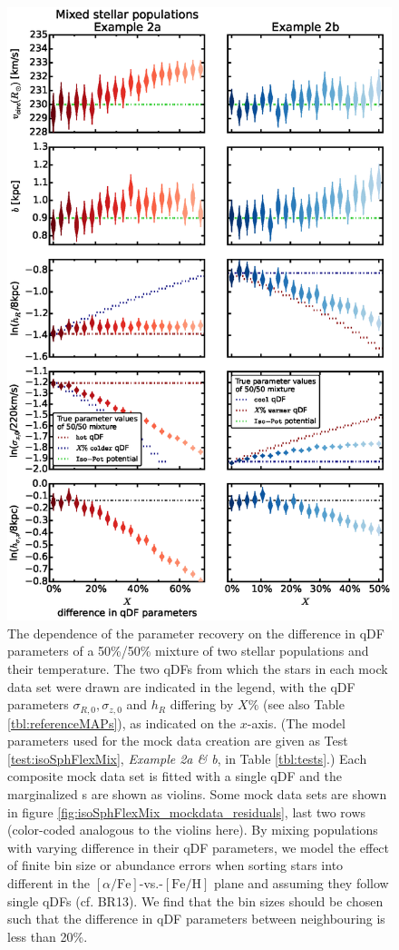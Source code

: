 \begin{figure}[!htbp]
\centering
\includegraphics[scale=0.45]{figs/isoSphFlexMixDiff_violins_2.eps}
\caption{The dependence of the parameter recovery on the difference in qDF parameters of a 50\%/50\% mixture of two stellar populations and their temperature. The two qDFs from which the stars in each mock data set were drawn are indicated in the legend, with the qDF parameters $\sigma_{R,0}, \sigma_{z,0}$ and $h_R$ differing by $X\%$ (see also Table \ref{tbl:referenceMAPs}), as indicated on the $x$-axis. (The model parameters used for the mock data creation are given as Test \ref{test:isoSphFlexMix}, \emph{Example 2a \& b}, in Table \ref{tbl:tests}.) Each composite mock data set is fitted with a single qDF and the marginalized \pdf{}s are shown as violins. Some mock data sets are shown in figure \ref{fig:isoSphFlexMix_mockdata_residuals}, last two rows (color-coded analogous to the violins here). By mixing populations with varying difference in their qDF parameters, we model the effect of finite bin size or abundance errors when sorting stars into different \MAPs{} in the $[\alpha/\mathrm{Fe}]$-vs.-$[\mathrm{Fe}/\mathrm{H}]$ plane and assuming they follow single qDFs (cf. BR13). We find that the bin sizes should be chosen such that the difference in qDF parameters between neighbouring \MAPs{} is less than 20\%. } 
\label{fig:isoSphFlexMixDiff}
\end{figure}

